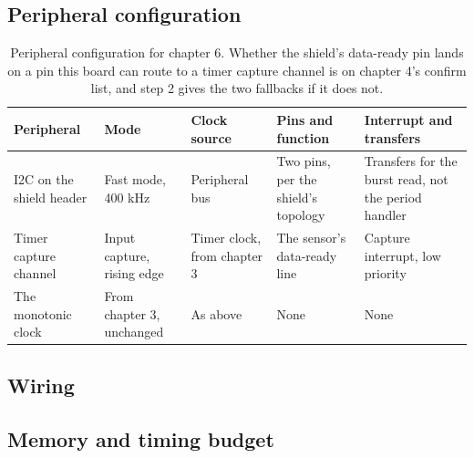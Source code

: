 \subsection*{Peripheral configuration}

\begin{table}[H]\centering\small
\begin{tabular}{p{22mm}p{26mm}p{24mm}p{30mm}p{30mm}}
\toprule
Peripheral & Mode & Clock source & Pins and function & Interrupt and transfers \\
\midrule
I2C on the shield header & Fast mode, 400 kHz & Peripheral bus & Two pins, per the shield's topology & Transfers for the burst read, not the period handler \\
Timer capture channel & Input capture, rising edge & Timer clock, from chapter 3 & The sensor's data-ready line & Capture interrupt, low priority \\
The monotonic clock & From chapter 3, unchanged & As above & None & None \\
\bottomrule
\end{tabular}
\caption{Peripheral configuration for chapter 6. Whether the shield's data-ready pin lands on a pin this board can route to a timer capture channel is on chapter 4's confirm list, and step 2 gives the two fallbacks if it does not.}
\end{table}

\subsection*{Wiring}


\subsection*{Memory and timing budget}

